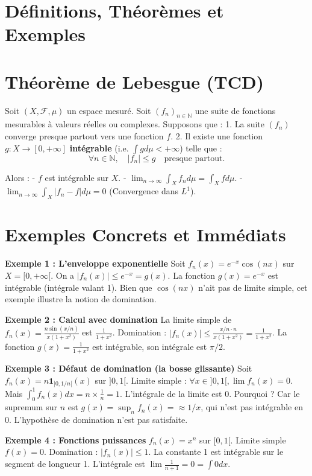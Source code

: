 \documentclass[11pt,a4paper]{article}
\begin{document}
\section{Définitions, Théorèmes et Exemples}

\section{Théorème de Lebesgue (TCD)}

Soit $(X, \mathcal{F}, \mu)$ un espace mesuré.
Soit $(f_n)_{n \in \mathbb{N}}$ une suite de fonctions mesurables à valeurs réelles ou complexes.
Supposons que :
1. La suite $(f_n)$ converge presque partout vers une fonction $f$.
2. Il existe une fonction $g : X \to [0, +\infty]$ \textbf{intégrable} (i.e. $\int g d\mu < +\infty$) telle que :
   $$\forall n \in \mathbb{N}, \quad |f_n| \le g \quad \text{presque partout.}$$

Alors :
- $f$ est intégrable sur $X$.
- $\lim_{n \to \infty} \int_X f_n d\mu = \int_X f d\mu$.
- $\lim_{n \to \infty} \int_X |f_n - f| d\mu = 0$ (Convergence dans $L^1$).

\section{Exemples Concrets et Immédiats}

\textbf{Exemple 1 : L'enveloppe exponentielle}
Soit $f_n(x) = e^{-x} \cos(nx)$ sur $X = [0, +\infty[$.
On a $|f_n(x)| \le e^{-x} = g(x)$. La fonction $g(x) = e^{-x}$ est intégrable (intégrale valant 1).
Bien que $\cos(nx)$ n'ait pas de limite simple, cet exemple illustre la notion de domination.

\textbf{Exemple 2 : Calcul avec domination}
La limite simple de $f_n(x) = \frac{n\sin(x/n)}{x(1+x^2)}$ est $\frac{1}{1+x^2}$.
Domination : $|f_n(x)| \le \frac{x/n \cdot n}{x(1+x^2)} = \frac{1}{1+x^2}$.
La fonction $g(x) = \frac{1}{1+x^2}$ est intégrable, son intégrale est $\pi/2$.

\textbf{Exemple 3 : Défaut de domination (la bosse glissante)}
Soit $f_n(x) = n \mathbf{1}_{]0, 1/n[}(x)$ sur $]0, 1[$.
Limite simple : $\forall x \in ]0, 1[, \lim f_n(x) = 0$.
Mais $\int_0^1 f_n(x) dx = n \times \frac{1}{n} = 1$. L'intégrale de la limite est 0.
Pourquoi ? Car le supremum sur $n$ est $g(x) = \sup_n f_n(x) = \approx 1/x$, qui n'est pas intégrable en 0. L'hypothèse de domination n'est pas satisfaite.

\textbf{Exemple 4 : Fonctions puissances}
$f_n(x) = x^n$ sur $[0, 1[$.
Limite simple $f(x) = 0$.
Domination : $|f_n(x)| \le 1$. La constante 1 est intégrable sur le segment de longueur 1.
L'intégrale est $\lim \frac{1}{n+1} = 0 = \int 0 dx$.
\end{document}
